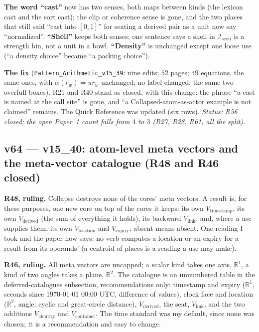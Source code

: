 \documentclass[11pt]{article}
\begin{document}
\textbf{The word ``cast''} now has two senses, both maps between kinds (the lexicon cast and the sort cast); the clip or coherence sense is gone, and the two places that still said ``cast into $[0,1]$'' for seating a derived pair as a unit now say ``normalized''. \textbf{``Shell''} keeps both senses; one sentence says a shell in $\mathcal I_{\mathrm{scon}}$ is a strength bin, not a unit in a bowl. \textbf{``Density''} is unchanged except one loose use (``a density choice'' became ``a packing choice'').

\textbf{The fix} (\texttt{Pattern\_Arithmetic\_v15\_39}: nine edits; $52$ pages; $49$ equations, the same ones, with $\alpha(r_w)=\pi r_w$ unchanged; no label changed; the same two overfull boxes). R21 and R40 stand as closed, with this change: the phrase ``a cast is named at the call site'' is gone, and ``a Collapsed-atom-as-actor example is not claimed'' remains. The Quick Reference was updated (six rows).
\emph{Status: R56 closed; the open Paper~1 count falls from $4$ to $3$ (R27, R28, R61, all the split).}

\subsection*{v64 --- v15\_40: atom-level meta vectors and the meta-vector catalogue (R48 and R46 closed)}
\textbf{R48, ruling.} Collapse destroys none of the cores' meta vectors. A result is, for these purposes, one new core on top of the cores it keeps: its own $V_{\text{timestamp}}$, its own $V_{\text{derived}}$ (the sum of everything it holds), its backward $V_{\text{link}}$, and, where a use supplies them, its own $V_{\text{location}}$ and $V_{\text{expiry}}$; absent means absent. One reading I took and the paper now says: no verb computes a location or an expiry for a result from its operands' (a centroid of places is a reading a use may make).

\textbf{R46, ruling.} All meta vectors are uncapped; a scalar kind takes one axis, $\mathbb R^1$, a kind of two angles takes a plane, $\mathbb R^2$. The catalogue is an unnumbered table in the deferred-catalogues subsection, recommendations only: timestamp and expiry ($\mathbb R^1$, seconds since 1970-01-01 00:00 UTC, difference of values), clock face and location ($\mathbb R^2$, angle; cyclic and great-circle distance), $V_{\text{derived}}$, the seat, $V_{\text{link}}$, and the two additions $V_{\text{identity}}$ and $V_{\text{container}}$. The time standard was my default, since none was chosen; it is a recommendation and easy to change.
\end{document}
